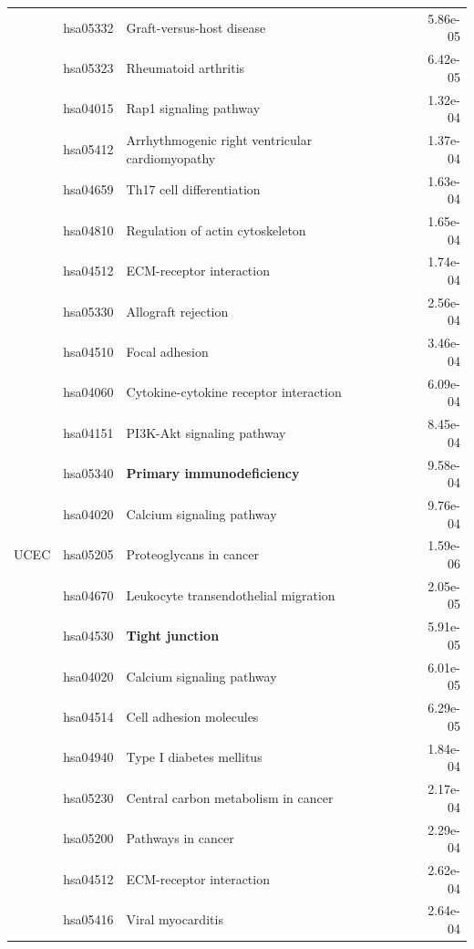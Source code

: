\begin{longtable}{cllr}
 & hsa05332 & \textcolor{\clrnew}{Graft-versus-host disease} & 5.86e-05 \\ 
 & hsa05323 & \textcolor{\clrnew}{Rheumatoid arthritis} & 6.42e-05 \\ 
 & hsa04015 & \textcolor{\clrnew}{Rap1 signaling pathway} & 1.32e-04 \\ 
 & hsa05412 & \textcolor{\clrnew}{Arrhythmogenic right ventricular cardiomyopathy} & 1.37e-04 \\ 
 & hsa04659 & \textcolor{\clrnew}{Th17 cell differentiation} & 1.63e-04 \\ 
 & hsa04810 & \textcolor{\clrnew}{Regulation of actin cytoskeleton} & 1.65e-04 \\ 
 & hsa04512 & \textcolor{\clrnew}{ECM-receptor interaction} & 1.74e-04 \\ 
 & hsa05330 & \textcolor{\clrnew}{Allograft rejection} & 2.56e-04 \\ 
 & hsa04510 & \textcolor{\clrnew}{Focal adhesion} & 3.46e-04 \\ 
 & hsa04060 & \textcolor{\clrnew}{Cytokine-cytokine receptor interaction} & 6.09e-04 \\ 
 & hsa04151 & \textcolor{\clrnew}{PI3K-Akt signaling pathway} & 8.45e-04 \\ 
 \rowcolor{\clrpath}& hsa05340 & \textbf{Primary immunodeficiency} & 9.58e-04 \\ 
 & hsa04020 & \textcolor{\clrnew}{Calcium signaling pathway} & 9.76e-04 \\ 
\midrule 
UCEC & hsa05205 & \textcolor{\clrnew}{Proteoglycans in cancer} & 1.59e-06\\ 
 & hsa04670 & \textcolor{\clrnew}{Leukocyte transendothelial migration} & 2.05e-05 \\ 
 \rowcolor{\clrpath}& hsa04530 & \textbf{Tight junction} & 5.91e-05 \\ 
 & hsa04020 & \textcolor{\clrnew}{Calcium signaling pathway} & 6.01e-05 \\ 
 & hsa04514 & \textcolor{\clrnew}{Cell adhesion molecules} & 6.29e-05 \\ 
 & hsa04940 & \textcolor{\clrnew}{Type I diabetes mellitus} & 1.84e-04 \\ 
 & hsa05230 & \textcolor{\clrnew}{Central carbon metabolism in cancer} & 2.17e-04 \\ 
 & hsa05200 & \textcolor{\clrnew}{Pathways in cancer} & 2.29e-04 \\ 
 & hsa04512 & \textcolor{\clrnew}{ECM-receptor interaction} & 2.62e-04 \\ 
 & hsa05416 & \textcolor{\clrnew}{Viral myocarditis} & 2.64e-04 \\ 

\end{longtable}
